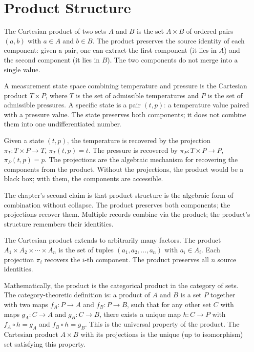 \section{Product Structure}
\label{se:product-structure}

The Cartesian product of two sets $A$ and $B$ is the set $A \times B$
of ordered pairs $(a, b)$ with $a \in A$ and $b \in B$. The product
preserves the source identity of each component: given a pair, one
can extract the first component (it lies in $A$) and the second
component (it lies in $B$). The two components do not merge into a
single value.

A measurement state space combining temperature and pressure is the
Cartesian product $T \times P$, where $T$ is the set of admissible
temperatures and $P$ is the set of admissible pressures. A specific
state is a pair $(t, p)$: a temperature value paired with a pressure
value. The state preserves both components; it does not combine them
into one undifferentiated number.

Given a state $(t, p)$, the temperature is recovered by the
projection $\pi_T : T \times P \to T$, $\pi_T(t, p) = t$. The
pressure is recovered by $\pi_P : T \times P \to P$, $\pi_P(t, p) =
p$. The projections are the algebraic mechanism for recovering the
components from the product. Without the projections, the product
would be a black box; with them, the components are accessible.

The chapter's second claim is that product structure is the
algebraic form of combination without collapse. The product
preserves both components; the projections recover them. Multiple
records combine via the product; the product's structure remembers
their identities.

The Cartesian product extends to arbitrarily many factors. The
product $A_1 \times A_2 \times \cdots \times A_n$ is the set of
tuples $(a_1, a_2, \ldots, a_n)$ with $a_i \in A_i$. Each
projection $\pi_i$ recovers the $i$-th component. The product
preserves all $n$ source identities.

Mathematically, the product is the categorical product in the
category of sets. The category-theoretic definition is: a product
of $A$ and $B$ is a set $P$ together with two maps $f_A : P \to A$
and $f_B : P \to B$, such that for any other set $C$ with maps
$g_A : C \to A$ and $g_B : C \to B$, there exists a unique map
$h : C \to P$ with $f_A \circ h = g_A$ and $f_B \circ h = g_B$.
This is the universal property of the product. The Cartesian
product $A \times B$ with its projections is the unique
(up to isomorphism) set satisfying this property.

